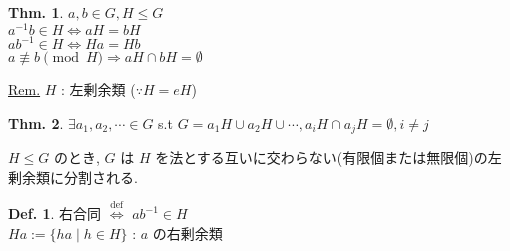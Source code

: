 \documentclass[uplatex,dvipdfmx,9pt]{beamer}
\newcommand{\defarrow}{\overset{\mathrm{def}}{\Leftrightarrow}}
\theoremstyle{definition} %
\newtheorem{defn}{Def.}[subsection] %
\newtheorem{thm}{Thm.}[subsection] %
\theoremstyle{example}
\begin{document}
      \begin{frame}

        \begin{thm}
          $a,b \in G, H \le G$ \\
          $a^{-1}b \in H \Leftrightarrow aH = bH$ \\
          $ab^{-1} \in H \Leftrightarrow Ha = Hb$ \\
          $a \not\equiv b \pmod{H} \Rightarrow aH \cap bH = \emptyset$
        \end{thm}
        \underline{Rem.} $H$ : 左剰余類 ($\because H = eH$) \\

        \begin{thm}
          $\exists a_1, a_2, \cdots \in G$ s.t $G = a_1H \cup a_2H \cup \cdots, a_iH \cap a_jH = \emptyset, i \ne j$
        \end{thm}
        $H \le G$ のとき, $G$ は $H$ を法とする互いに交わらない(有限個または無限個)の左剰余類に分割される.

        \begin{defn}
          \alert{右合同} $\defarrow$ $ab^{-1} \in H$ \\
          $Ha := \{ha \mid h \in H\}$ : $a$ の\alert{右剰余類}
        \end{defn}
      
      \end{frame}
\end{document}
